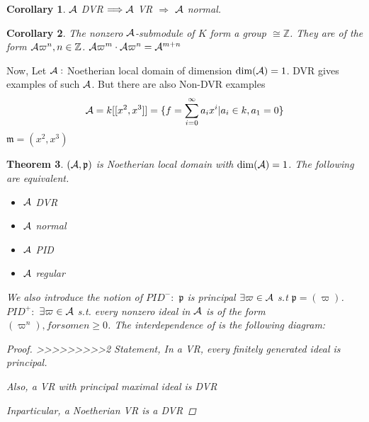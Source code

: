 \documentclass[11pt]{article}
\newtheorem{thm}{Theorem}[section]
\newtheorem{cor}[thm]{Corollary}
\newcommand{\intg}{\mathbb Z}
\newcommand{\scm}{{\mathfrak m}}
\newcommand{\scp}{{\mathfrak p}}
\newcommand{\cala}{{\cal A}}
\newcommand{\Lrta}{\Longrightarrow}
\begin{document}
\begin{cor}
$\cala$ DVR $\Lrta \cala$ VR $\Lrta $ $\cala$ normal.
\end{cor}

\begin{cor}
The nonzero $\cala$-submodule of $K$ form a group $\cong \intg$. They are of the form $\cala\varpi^n, n\in \intg$. $\cala\varpi^m\cdot \cala\varpi^n=\cala^{m+n}$
\end{cor}

Now, Let $\cala:$ Noetherian local domain of dimension $\text{dim}(\cala)=1$. DVR gives examples of such $\cala$. But there are also Non-DVR examples
$$
\cala=k[[x^2,x^3]]=\{f=\sum^{\infty}_{i=0}a_i x^i|a_i\in k, a_1=0\}
$$
$\scm=(x^2,x^3)$

\begin{thm} $(\cala,\scp)$ is Noetherian local domain with $\text{dim}(\cala)=1$.  
The following are equivalent.
\begin{itemize}
\item $\cala$ DVR
\item $\cala$ normal
\item $\cala$ PID
\item $\cala$ regular
\end{itemize}

We also introduce the notion of $PID^-:$ $\scp$ is principal $\exists \varpi\in \cala$ s.t $\scp=(\varpi)$.\\
 $PID^{+}:$ $\exists \varpi \in\cala$ s.t. every nonzero ideal in $\cala$ is of the form $(\varpi^n), for some n\geq 0$.
The interdependence of is the following diagram:

\begin{proof}
>>>>>>>>>2
Statement, In a VR, every finitely generated ideal is principal. 

Also, a VR with principal maximal  ideal is DVR

Inparticular, a Noetherian VR is  a DVR
\end{proof}
\end{thm}
\end{document}
